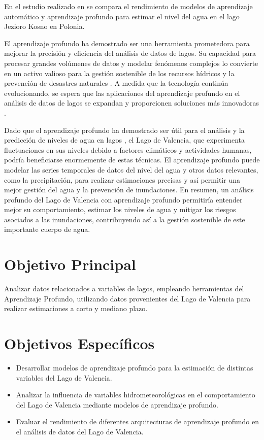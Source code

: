 \documentclass[12pt]{article}
\begin{document}
En el estudio realizado en \cite{ayus2023} se compara el rendimiento de modelos de aprendizaje automático y aprendizaje profundo para estimar el nivel del agua en el lago Jezioro Kosno en Polonia.

El aprendizaje profundo ha demostrado ser una herramienta prometedora para mejorar la precisión y eficiencia del análisis de datos de lagos. Su capacidad para procesar grandes volúmenes de datos y modelar fenómenos complejos lo convierte en un activo valioso para la gestión sostenible de los recursos hídricos y la prevención de desastres naturales \cite{bentivoglio2022}. A medida que la tecnología continúa evolucionando, se espera que las aplicaciones del aprendizaje profundo en el análisis de datos de lagos se expandan y proporcionen soluciones más innovadoras \cite{bentivoglio2022,higham2019}.

Dado que el aprendizaje profundo ha demostrado ser útil para el análisis y la predicción de niveles de agua en lagos \cite{ayus2023}, el Lago de Valencia, que experimenta fluctuaciones en sus niveles debido a factores climáticos y actividades humanas, podría beneficiarse enormemente de estas técnicas. El aprendizaje profundo puede modelar las series temporales de datos del nivel del agua y otros datos relevantes, como la precipitación, para realizar estimaciones precisas y así permitir una mejor gestión del agua y la prevención de inundaciones. En resumen, un análisis profundo del Lago de Valencia con aprendizaje profundo permitiría entender mejor su comportamiento, estimar los niveles de agua y mitigar los riesgos asociados a las inundaciones, contribuyendo así a la gestión sostenible de este importante cuerpo de agua.


\section{Objetivo Principal}
Analizar datos relacionados a variables de lagos, empleando herramientas del Aprendizaje Profundo, utilizando datos provenientes del Lago de Valencia para realizar estimaciones a corto y mediano plazo.

\section{Objetivos Específicos}
\begin{itemize}
    \item Desarrollar modelos de aprendizaje profundo para la estimación de distintas variables del Lago de Valencia.
    \item Analizar la influencia de variables hidrometeorológicas en el comportamiento del Lago de Valencia mediante modelos de aprendizaje profundo.
    \item Evaluar el rendimiento de diferentes arquitecturas de aprendizaje profundo en el análisis de datos del Lago de Valencia.
\end{itemize}
\end{document}
